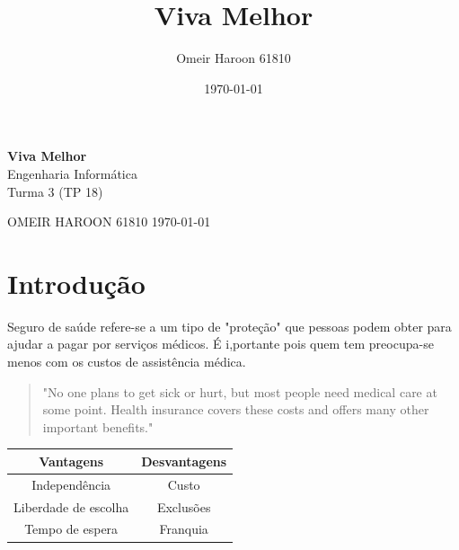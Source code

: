 \documentclass[10pt,a4paper]{article}
\title{Viva Melhor}
\author{Omeir Haroon 61810}
\date{\today}
\begin{document}
\begin{titlepage}
	\begin{center}
	{\Huge\bfseries Viva Melhor}\\
	\vspace{1cm}
	{\Large Engenharia Informática}\\
	\vspace{1cm}
	{\Large Turma 3 (TP 18)}\\
	\end{center}
	\begin{flushright}
	{\Large OMEIR HAROON \Large 61810 \hfill  \large\today}
	\end{flushright}
	\begin{figure}[h]
	\begin{center}
	\end{center}
	\end{figure}
\end{titlepage}



\section{Introdução}
	Seguro de saúde refere-se a um tipo de "proteção"
que pessoas podem obter para ajudar a pagar por serviços médicos. É i,portante pois quem tem preocupa-se menos com os custos de assistência médica.
\begin{quote}
    "No one plans to get sick or hurt, but most people need medical care at some point. Health insurance covers these costs and offers many other important benefits." \cite{healthcare}
\end{quote}

\begin{multicolum}
	\begin{center}
	\begin{tabular}{|c|c|} 
	\hline
	{\bfseries Vantagens} & {\bfseries Desvantagens}\\
	\hline
	Independência &  Custo\\
	\hline	
	Liberdade de escolha & Exclusões\\
	\hline	
	Tempo de espera  & Franquia\\
	\hline
	\end{tabular}	    \\
	\caption{Vantagens e Desvantagens de seguro de saúde}\\
	\end{center}

\end{multicolum}
\newpage
\end{document}
